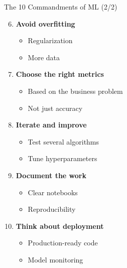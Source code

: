 \documentclass[12pt,aspectratio=169]{beamer}
\begin{document}
\begin{frame}{The 10 Commandments of ML (2/2)}
\begin{enumerate}
\setcounter{enumi}{5}
\item \textbf{Avoid overfitting}
\begin{itemize}
\item Regularization
\item More data
\end{itemize}

\item \textbf{Choose the right metrics}
\begin{itemize}
\item Based on the business problem
\item Not just accuracy
\end{itemize}

\item \textbf{Iterate and improve}
\begin{itemize}
\item Test several algorithms
\item Tune hyperparameters
\end{itemize}

\item \textbf{Document the work}
\begin{itemize}
\item Clear notebooks
\item Reproducibility
\end{itemize}

\item \textbf{Think about deployment}
\begin{itemize}
\item Production-ready code
\item Model monitoring
\end{itemize}
\end{enumerate}
\end{frame}
\end{document}
